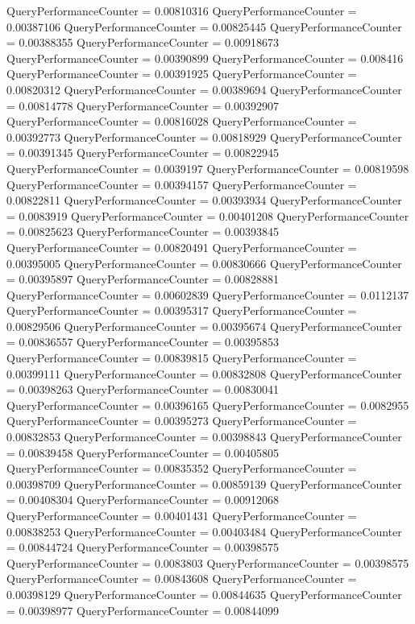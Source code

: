 \documentclass[9pt]{article}
\theoremstyle{plain}
\theoremstyle{definition}
\theoremstyle{remark}
\numberwithin{equation}{section}
\begin{document}
QueryPerformanceCounter  =  0.00810316
QueryPerformanceCounter  =  0.00387106
QueryPerformanceCounter  =  0.00825445
QueryPerformanceCounter  =  0.00388355
QueryPerformanceCounter  =  0.00918673
QueryPerformanceCounter  =  0.00390899
QueryPerformanceCounter  =  0.008416
QueryPerformanceCounter  =  0.00391925
QueryPerformanceCounter  =  0.00820312
QueryPerformanceCounter  =  0.00389694
QueryPerformanceCounter  =  0.00814778
QueryPerformanceCounter  =  0.00392907
QueryPerformanceCounter  =  0.00816028
QueryPerformanceCounter  =  0.00392773
QueryPerformanceCounter  =  0.00818929
QueryPerformanceCounter  =  0.00391345
QueryPerformanceCounter  =  0.00822945
QueryPerformanceCounter  =  0.0039197
QueryPerformanceCounter  =  0.00819598
QueryPerformanceCounter  =  0.00394157
QueryPerformanceCounter  =  0.00822811
QueryPerformanceCounter  =  0.00393934
QueryPerformanceCounter  =  0.0083919
QueryPerformanceCounter  =  0.00401208
QueryPerformanceCounter  =  0.00825623
QueryPerformanceCounter  =  0.00393845
QueryPerformanceCounter  =  0.00820491
QueryPerformanceCounter  =  0.00395005
QueryPerformanceCounter  =  0.00830666
QueryPerformanceCounter  =  0.00395897
QueryPerformanceCounter  =  0.00828881
QueryPerformanceCounter  =  0.00602839
QueryPerformanceCounter  =  0.0112137
QueryPerformanceCounter  =  0.00395317
QueryPerformanceCounter  =  0.00829506
QueryPerformanceCounter  =  0.00395674
QueryPerformanceCounter  =  0.00836557
QueryPerformanceCounter  =  0.00395853
QueryPerformanceCounter  =  0.00839815
QueryPerformanceCounter  =  0.00399111
QueryPerformanceCounter  =  0.00832808
QueryPerformanceCounter  =  0.00398263
QueryPerformanceCounter  =  0.00830041
QueryPerformanceCounter  =  0.00396165
QueryPerformanceCounter  =  0.0082955
QueryPerformanceCounter  =  0.00395273
QueryPerformanceCounter  =  0.00832853
QueryPerformanceCounter  =  0.00398843
QueryPerformanceCounter  =  0.00839458
QueryPerformanceCounter  =  0.00405805
QueryPerformanceCounter  =  0.00835352
QueryPerformanceCounter  =  0.00398709
QueryPerformanceCounter  =  0.00859139
QueryPerformanceCounter  =  0.00408304
QueryPerformanceCounter  =  0.00912068
QueryPerformanceCounter  =  0.00401431
QueryPerformanceCounter  =  0.00838253
QueryPerformanceCounter  =  0.00403484
QueryPerformanceCounter  =  0.00844724
QueryPerformanceCounter  =  0.00398575
QueryPerformanceCounter  =  0.0083803
QueryPerformanceCounter  =  0.00398575
QueryPerformanceCounter  =  0.00843608
QueryPerformanceCounter  =  0.00398129
QueryPerformanceCounter  =  0.00844635
QueryPerformanceCounter  =  0.00398977
QueryPerformanceCounter  =  0.00844099
\end{document}
